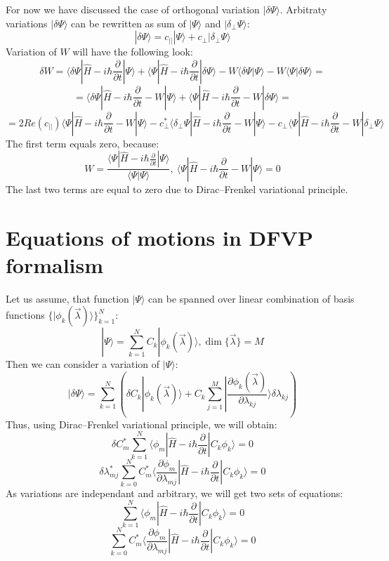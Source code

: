 \documentclass[a4paper,14pt]{extarticle}
\begin{document}
For now we have discussed the case of orthogonal variation $|\delta\Psi\rangle$. 
Arbitraty variations $|\delta\Psi\rangle$ can be rewritten as sum of $|\Psi\rangle$ and $|\delta_{\perp}\Psi\rangle$:
$$|\delta\Psi\rangle = c_{||}|\Psi\rangle + c_{\perp}|\delta_{\perp}\Psi\rangle$$
Variation of $W$ will have the following look:
$$\delta W = \langle\delta\Psi|\hat{H}-i\hbar\frac{\partial}{\partial t}|\Psi\rangle + %
	     \langle\Psi|\hat{H}-i\hbar\frac{\partial}{\partial t}|\delta\Psi\rangle - 
	     W\langle\delta\Psi|\Psi\rangle - W\langle\Psi|\delta\Psi\rangle = $$
$$ = \langle\delta\Psi|\hat{H}-i\hbar\frac{\partial}{\partial t}-W|\Psi\rangle + %
     \langle\Psi|\hat{H}-i\hbar\frac{\partial}{\partial t}-W|\delta\Psi\rangle = $$
$$ = 2\mathit{Re}(c_{||})\langle\Psi|\hat{H}-i\hbar\frac{\partial}{\partial t}-W|\Psi\rangle - %
     c_{\perp}^*\langle\delta_{\perp}\Psi|\hat{H}-i\hbar\frac{\partial}{\partial t}-W|\Psi\rangle - %
     c_{\perp}\langle\Psi|\hat{H}-i\hbar\frac{\partial}{\partial t}-W|\delta_{\perp}\Psi\rangle $$
The first term equals zero, because:
$$W = \frac{\langle\Psi|\hat{H}-i\hbar\frac{\partial}{\partial t}|\Psi\rangle}{\langle\Psi|\Psi\rangle},\ %
      \langle\Psi|\hat{H}-i\hbar\frac{\partial}{\partial t}-W|\Psi\rangle = 0$$
The last two terms are equal to zero due to Dirac--Frenkel variational principle.

\section{Equations of motions in DFVP formalism}
Let us assume, that function $|\Psi\rangle$ can be spanned over linear combination of basis functions $\{|\phi_k(\vec{\lambda})\rangle\}_{k=1}^N$:
$$|\Psi\rangle = \sum_{k=1}^NC_k|\phi_k(\vec{\lambda})\rangle, \dim\{\vec{\lambda}\} = M$$
Then we can consider a variation of $|\Psi\rangle$:
$$|\delta\Psi\rangle = \sum_{k=1}^N \left( \delta C_k|\phi_k(\vec{\lambda})\rangle + %
					   C_k\sum_{j=1}^M|\frac{\partial\phi_k(\vec{\lambda})}{\partial\lambda_{kj}}\rangle\delta\lambda_{kj} \right)$$
Thus, using Dirac--Frenkel variational principle, we will obtain:
$$\delta C_m^*\sum_{k=1}^N\langle\phi_m|\hat{H}-i\hbar\frac{\partial}{\partial t}|C_k\phi_k\rangle=0$$
$$\delta\lambda_{mj}^*\sum_{k=0}^NC_m^*\langle\frac{\partial\phi_m}{\partial\lambda_{mj}}|\hat{H}-i\hbar\frac{\partial}{\partial t}|C_k\phi_k\rangle = 0$$
As variations are independant and arbitrary, we will get two sets of equations:
$$\sum_{k=1}^N\langle\phi_m|\hat{H}-i\hbar\frac{\partial}{\partial t}|C_k\phi_k\rangle=0$$
$$\sum_{k=0}^NC_m^*\langle\frac{\partial\phi_m}{\partial\lambda_{mj}}|\hat{H}-i\hbar\frac{\partial}{\partial t}|C_k\phi_k\rangle = 0$$
\end{document}
